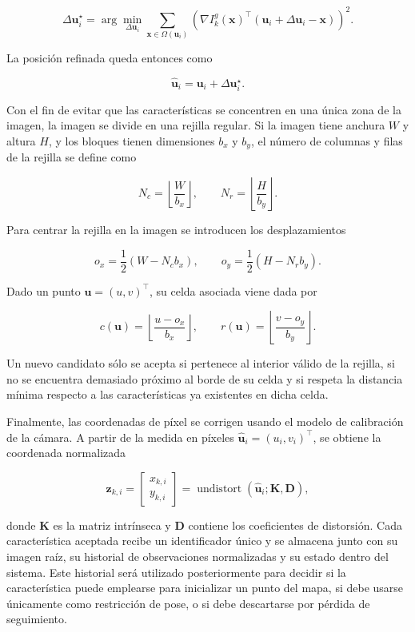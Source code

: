 \[
\Delta \mathbf{u}_i^\star =
\arg\min_{\Delta \mathbf{u}_i}
\sum_{\mathbf{x} \in \Omega(\mathbf{u}_i)}
\left(
\nabla I_k^g(\mathbf{x})^\top
(\mathbf{u}_i + \Delta \mathbf{u}_i - \mathbf{x})
\right)^2.
\]

La posición refinada queda entonces como

\[
\hat{\mathbf{u}}_i = \mathbf{u}_i + \Delta \mathbf{u}_i^\star.
\]

Con el fin de evitar que las características se concentren en una única zona de la imagen,
la imagen se divide en una rejilla regular. Si la imagen tiene anchura $W$ y altura $H$,
y los bloques tienen dimensiones $b_x$ y $b_y$, el número de columnas y filas de la
rejilla se define como

\[
N_c = \left\lfloor \frac{W}{b_x} \right\rfloor,
\qquad
N_r = \left\lfloor \frac{H}{b_y} \right\rfloor.
\]

Para centrar la rejilla en la imagen se introducen los desplazamientos

\[
o_x = \frac{1}{2}(W - N_c b_x),
\qquad
o_y = \frac{1}{2}(H - N_r b_y).
\]

Dado un punto $\mathbf{u}=(u,v)^\top$, su celda asociada viene dada por

\[
c(\mathbf{u}) =
\left\lfloor \frac{u-o_x}{b_x} \right\rfloor,
\qquad
r(\mathbf{u}) =
\left\lfloor \frac{v-o_y}{b_y} \right\rfloor.
\]

Un nuevo candidato sólo se acepta si pertenece al interior válido de la rejilla, si no se
encuentra demasiado próximo al borde de su celda y si respeta la distancia mínima respecto
a las características ya existentes en dicha celda.

Finalmente, las coordenadas de píxel se corrigen usando el modelo de calibración de la
cámara. A partir de la medida en píxeles $\hat{\mathbf{u}}_i = (u_i,v_i)^\top$, se obtiene
la coordenada normalizada

\[
\mathbf{z}_{k,i} =
\begin{bmatrix}
x_{k,i} \\
y_{k,i}
\end{bmatrix}
=
\operatorname{undistort}(\hat{\mathbf{u}}_i;\mathbf{K},\mathbf{D}),
\]

donde $\mathbf{K}$ es la matriz intrínseca y $\mathbf{D}$ contiene los coeficientes de
distorsión.
Cada característica aceptada recibe un identificador único y se almacena junto con su
imagen raíz, su historial de observaciones normalizadas y su estado dentro del sistema.
Este historial será utilizado posteriormente para decidir si la característica puede
emplearse para inicializar un punto del mapa, si debe usarse únicamente como restricción
de pose, o si debe descartarse por pérdida de seguimiento.


